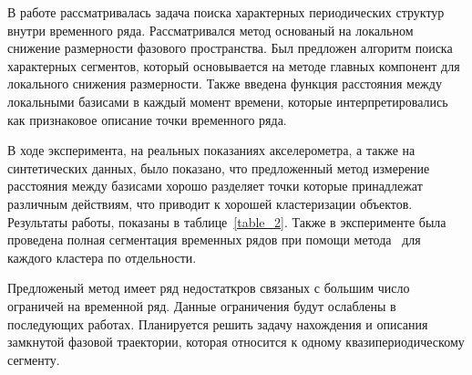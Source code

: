 \documentclass[12pt, twoside]{article}
\numberwithin{equation}{section}
\begin{document}
В работе рассматривалась задача поиска характерных периодических структур внутри временного ряда. 
Рассматривался метод основаный на локальном снижение размерности фазового пространства. 
Был предложен алгоритм поиска характерных сегментов, который основывается на методе главных компонент для локального снижения размерности. 
Также введена функция расстояния между локальными базисами в каждый момент времени, которые интерпретировались как признаковое описание точки временного ряда.

В ходе эксперимента, на реальных показаниях акселерометра, а также на синтетических данных, было показано, что предложенный метод измерение расстояния между базисами хорошо разделяет точки которые принадлежат различным действиям, что приводит к хорошей кластеризации объектов. 
Результаты работы, показаны в таблице~\ref{table_2}.
Также в эксперименте была проведена полная сегментация временных рядов при помощи метода~\cite{motrenko2015} для каждого кластера по отдельности.

Предложеный метод имеет ряд недостаткров связаных с большим число ограничей на временной ряд. 
Данные ограничения будут ослаблены в последующих работах. Планируется решить задачу нахождения и описания замкнутой фазовой траектории, которая относится к одному квазипериодическому сегменту. 


\appendix
\setcounter{theorem}{0}
\end{document}
